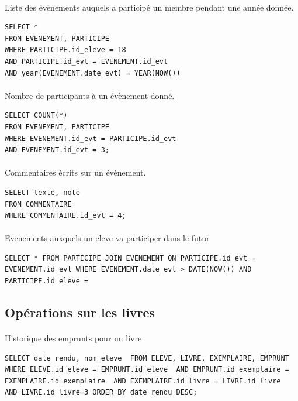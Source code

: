 \documentclass[a4paper, 11pt]{article}
\begin{document}
\paragraph{}
Liste des évènements auquels a participé un membre pendant une année donnée.
\begin{verbatim}
SELECT *
FROM EVENEMENT, PARTICIPE
WHERE PARTICIPE.id_eleve = 18
AND PARTICIPE.id_evt = EVENEMENT.id_evt
AND year(EVENEMENT.date_evt) = YEAR(NOW())
\end{verbatim}
\paragraph{}
Nombre de participants à un évènement donné.
\begin{verbatim}
SELECT COUNT(*)
FROM EVENEMENT, PARTICIPE
WHERE EVENEMENT.id_evt = PARTICIPE.id_evt
AND EVENEMENT.id_evt = 3;
\end{verbatim}
\paragraph{}
Commentaires écrits sur un évènement.
\begin{verbatim}
SELECT texte, note 
FROM COMMENTAIRE
WHERE COMMENTAIRE.id_evt = 4;
\end{verbatim}
\paragraph{}
Evenements auxquels un eleve va participer dans le futur
\begin{verbatim}
SELECT * FROM PARTICIPE JOIN EVENEMENT ON PARTICIPE.id_evt = EVENEMENT.id_evt WHERE EVENEMENT.date_evt > DATE(NOW()) AND  PARTICIPE.id_eleve = 
\end{verbatim}
\subsection{Opérations sur les livres}
\paragraph{}
Historique des emprunts pour un livre
\begin{verbatim}
SELECT date_rendu, nom_eleve  FROM ELEVE, LIVRE, EXEMPLAIRE, EMPRUNT  WHERE ELEVE.id_eleve = EMPRUNT.id_eleve  AND EMPRUNT.id_exemplaire = EXEMPLAIRE.id_exemplaire  AND EXEMPLAIRE.id_livre = LIVRE.id_livre  AND LIVRE.id_livre=3 ORDER BY date_rendu DESC;
\end{verbatim}
\end{document}

